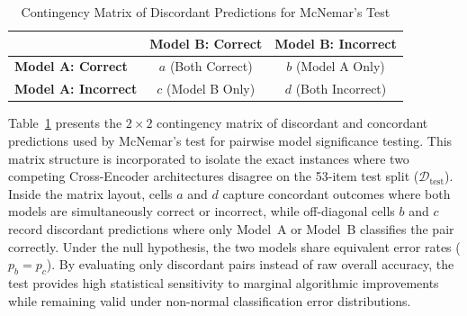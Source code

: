     \begin{table}[htbp]
        \centering
        \footnotesize
        \caption[Contingency Matrix of Discordant Predictions for McNemar's Test]{Contingency Matrix of Discordant Predictions for McNemar's Test}
        \label{tab:mcnemar_contingency}
        \begin{tabular}{lcc}
            \toprule
            & \textbf{Model B: Correct} & \textbf{Model B: Incorrect} \\
            \midrule
            \textbf{Model A: Correct} & $a$ (Both Correct) & $b$ (Model A Only) \\
            \textbf{Model A: Incorrect} & $c$ (Model B Only) & $d$ (Both Incorrect) \\
            \bottomrule
        \end{tabular}
    \end{table}

    Table~\ref{tab:mcnemar_contingency} presents the $2 \times 2$ contingency matrix of discordant and concordant predictions used by McNemar's test for pairwise model significance testing. This matrix structure is incorporated to isolate the exact instances where two competing Cross-Encoder architectures disagree on the 53-item test split ($\mathcal{D}_{\text{test}}$). Inside the matrix layout, cells $a$ and $d$ capture concordant outcomes where both models are simultaneously correct or incorrect, while off-diagonal cells $b$ and $c$ record discordant predictions where only Model~A or Model~B classifies the pair correctly. Under the null hypothesis, the two models share equivalent error rates ($p_b = p_c$). By evaluating only discordant pairs instead of raw overall accuracy, the test provides high statistical sensitivity to marginal algorithmic improvements while remaining valid under non-normal classification error distributions.

